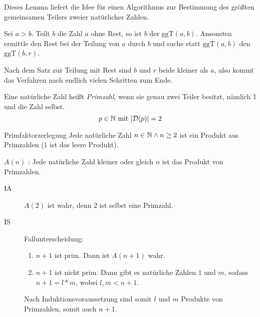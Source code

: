 \par\medskip
Dieses Lemma liefert die Idee für einen Algorithmus zur Bestimmung des größten gemeinsamen Teilers zweier natürlicher Zahlen.

Sei $a>b$. Teilt $b$ die Zahl $a$ ohne Rest, so ist $b$ der $\mathrm{ggT}(a,b)$. Ansonsten ermittle den Rest bei der Teilung von $a$ durch $b$ und suche statt $\mathrm{ggT}(a,b)$ den $\mathrm{ggT}(b,r)$.

Nach dem Satz zur Teilung mit Rest sind $b$ und $r$ beide kleiner als $a$, also kommt das Verfahren nach endlich vielen Schritten zum Ende.

Eine natürliche Zahl heißt \emph{Primzahl}, wenn sie genau zwei Teiler besitzt, nämlich 1 und die Zahl selbst.
\begin{equation*}
  p\in\mathbb{N} \text{ mit } |\mathcal{D}(p)| = 2
\end{equation*}

\begin{satz}{Primfaktorzerlegung}
  Jede natürliche Zahl $n\in\mathbb{N} \wedge n\geq2$ ist ein Produkt aus Primzahlen ($1$ ist das leere Produkt).
\end{satz}

\beweis
$A(n)$ : \glqq Jede natürliche Zahl kleiner oder gleich $n$ ist das Produkt von Primzahlen.\grqq

\begin{description}
  \item[IA] $A(2)$ ist wahr, denn $2$ ist selbst eine Primzahl.
  \item[IS] Fallunterscheidung:
  \begin{enumerate}
    \item $n+1$ ist prim. Dann ist $A(n+1)$ wahr.
    \item $n+1$ ist nicht prim. Dann gibt es natürliche Zahlen $1$ und $m$, sodass $n+1=l* m$, wobei $l,m<n+1$.
  \end{enumerate}
  Nach Induktionsvoraussetzung sind somit $l$ und $m$ Produkte von Primzahlen, somit auch $n+1$.
\end{description}
